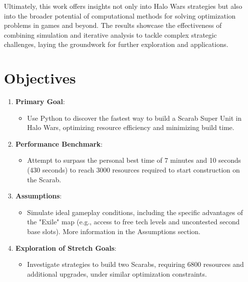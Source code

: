 \documentclass[a4paper, 12pt, english]{article}
\begin{document}
Ultimately, this work offers insights not only into Halo Wars strategies but also into the broader potential of computational methods for solving optimization problems in games and beyond. The results showcase the effectiveness of combining simulation and iterative analysis to tackle complex strategic challenges, laying the groundwork for further exploration and applications.
\newline


\newpage
\section{Objectives}
\begin{enumerate}
    \item \textbf{Primary Goal}:
    \begin{itemize}
        \item Use Python to discover the fastest way to build a Scarab Super Unit in Halo Wars, optimizing resource efficiency and minimizing build time.
    \end{itemize}

    \item \textbf{Performance Benchmark}:
    \begin{itemize}
        \item Attempt to surpass the personal best time of 7 minutes and 10 seconds (430 seconds) to reach 3000 resources required to start construction on the Scarab.
    \end{itemize}

    \item \textbf{Assumptions}:
    \begin{itemize}
        \item Simulate ideal gameplay conditions, including the specific advantages of the "Exile" map (e.g., access to free tech levels and uncontested second base slots). More information in the Assumptions section.
    \end{itemize}

    \item \textbf{Exploration of Stretch Goals}:
    \begin{itemize}
        \item Investigate strategies to build two Scarabs, requiring 6800 resources and additional upgrades, under similar optimization constraints.
    \end{itemize}


\end{enumerate}
\end{document}
